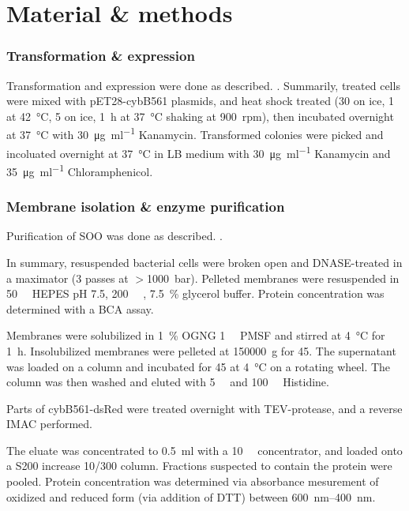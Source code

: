 \part{Material \& methods}

\section{Transformation \& expression}

\small

Transformation and expression were done as described.
\cite{superoxide_salvaging}. Summarily,  treated cells were mixed
with pET28-cybB561 plasmids, and heat shock treated (\SI{30}{\min} on ice,
\SI{1}{\min} at \SI{42}{\celsius}, \SI{5}{\min} on ice, \SI{1}{\hour} at
\SI{37}{\celsius} shaking at \SI{900}{rpm}), then incubated overnight at
\SI{37}{\celsius} with \SI{30}{\ug\per\ml} Kanamycin. Transformed colonies were
picked and incoluated overnight at \SI{37}{\celsius} in LB medium with
\SI{30}{\ug\per\ml} Kanamycin and \SI{35}{\ug\per\ml} Chloramphenicol.


\section{Membrane isolation \& enzyme purification}

Purification of SOO was done as described. \cite{superoxide_salvaging}.

In summary, resuspended bacterial cells were broken open and DNASE-treated in a
maximator (3 passes at $>$\SI{1000}{\bar}). Pelleted membranes were resuspended
in \SI{50}{\milli\Molar} HEPES pH 7.5, \SI{200}{\milli\Molar} ,
\SI{7.5}{\percent} glycerol buffer. Protein concentration was determined with a
BCA assay.

Membranes were solubilized in \SI{1}{\percent} OGNG \SI{1}{\milli\Molar} PMSF
and stirred at \SI{4}{\celsius} for \SI{1}{\hour}. Insolubilized membranes were
pelleted at \SI{150000}{g} for \SI{45}{\min}. The supernatant was loaded on a
 column and incubated for \SI{45}{\min} at \SI{4}{\celsius} on a
rotating wheel. The column was then washed and eluted with \SI{5}{\milli\Molar}
and \SI{100}{\milli\Molar} Histidine.

Parts of cybB561-dsRed were treated overnight with TEV-protease, and a reverse
 IMAC performed.

The eluate was concentrated to \SI{0.5}{\ml} with a \SI{10}{\kilo\Da}
concentrator, and loaded onto a S200 increase 10/300 column. Fractions
suspected to contain the protein were pooled. Protein concentration was
determined via absorbance mesurement of oxidized and reduced form (via addition
of DTT) between \SIrange{600}{400}{\nm}.

